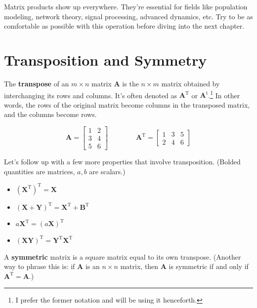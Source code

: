 \documentclass{report}
\begin{document}
\begin{onehalfspacing}
\begin{flushleft}
\medskip

Matrix products show up everywhere. They're essential for fields like population modeling, network theory, signal processing, advanced dynamics, etc. Try to be as comfortable as possible with this operation before diving into the next chapter.

\section{Transposition and Symmetry}

The \textbf{transpose} of an \(m\times n\) matrix \textbf{A} is the \(n\times m\) matrix obtained by interchanging its rows and columns. It's often denoted as {\(\textbf{A}^\text{T}\)} or \textbf{\(\textbf{A}^\text{t}\)}.\footnote{I prefer the former notation and will be using it henceforth.} In other words, the rows of the original matrix become columns in the transposed matrix, and the columns become rows.

\vspace{-0.1in}
\[\textbf{A} = \begin{bmatrix} 1 & 2 \\ 3 & 4 \\ 5 & 6 \end{bmatrix} \qquad \qquad \textbf{A}^\text{T} = \begin{bmatrix} 1 & 3 & 5 \\ 2 & 4 & 6 \end{bmatrix}\]

Let's follow up with a few more properties that involve transposition. (Bolded quantities are matrices, \(a, b\) are scalars.)

\begin{itemize}[noitemsep]
    \item \(\left(\textbf{X}^\text{T}\right)^\text{T} = \textbf{X}\)
    \item \((\textbf{X}+\textbf{Y})^\text{T} = \textbf{X}^\text{T} + \textbf{B}^\text{T}\)
    \item \(a\textbf{X}^\text{T} = (a\textbf{X})^\text{T}\)
    \item \((\textbf{X}\textbf{Y})^\text{T} = \textbf{Y}^\text{T} \textbf{X}^\text{T}\)
\end{itemize}

A \textbf{symmetric} matrix is a square matrix equal to its own transpose. (Another way to phrase this is: if \textbf{A} is an \(n\times n\) matrix, then \textbf{A} is symmetric if and only if \(\textbf{A}^\text{T} = \textbf{A}\).)


\end{flushleft}
\end{onehalfspacing}
\end{document}
